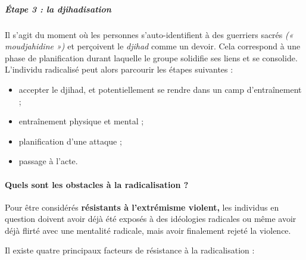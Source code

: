 \subparagraph{Étape 3 : la djihadisation}


Il s'agit du moment où les personnes s'auto-identifient à des guerriers
sacrés \emph{(« moudjahidine »)} et perçoivent le \emph{djihad} comme un
devoir. Cela correspond à une phase de planification durant laquelle le
groupe solidifie ses liens et se consolide. L'individu radicalisé peut
alors parcourir les étapes suivantes :


\begin{itemize}
\item
  
  accepter le djihad, et potentiellement se rendre dans un camp
  d'entraînement ;
  
\item
  
  entraînement physique et mental ;
  
\item
  
  planification d'une attaque ;
  
\item
  
  passage à l'acte.
  
\end{itemize}


  \paragraph{Quels sont les obstacles à la radicalisation ?}



Pour être considérés \textbf{résistants à l'extrémisme violent,} les
individus en question doivent avoir déjà été exposés à des idéologies
radicales ou même avoir déjà flirté avec une mentalité radicale, mais
avoir finalement rejeté la violence.

Il existe quatre principaux facteurs de résistance à la radicalisation :


